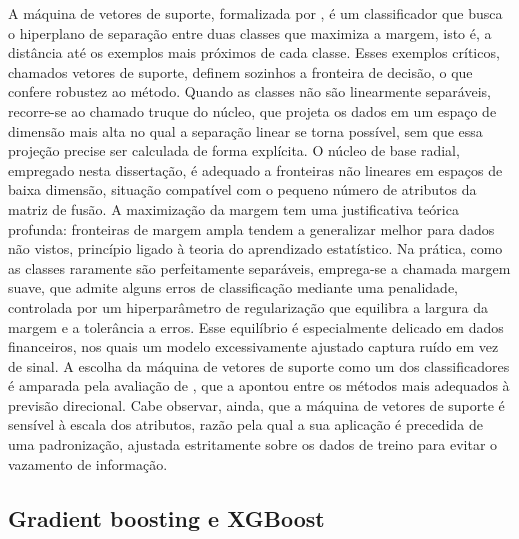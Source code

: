 A máquina de vetores de suporte, formalizada por , é um classificador que busca o hiperplano de separação entre duas classes que maximiza a margem, isto é, a distância até os exemplos mais próximos de cada classe. Esses exemplos críticos, chamados vetores de suporte, definem sozinhos a fronteira de decisão, o que confere robustez ao método. Quando as classes não são linearmente separáveis, recorre-se ao chamado truque do núcleo, que projeta os dados em um espaço de dimensão mais alta no qual a separação linear se torna possível, sem que essa projeção precise ser calculada de forma explícita. O núcleo de base radial, empregado nesta dissertação, é adequado a fronteiras não lineares em espaços de baixa dimensão, situação compatível com o pequeno número de atributos da matriz de fusão. A maximização da margem tem uma justificativa teórica profunda: fronteiras de margem ampla tendem a generalizar melhor para dados não vistos, princípio ligado à teoria do aprendizado estatístico. Na prática, como as classes raramente são perfeitamente separáveis, emprega-se a chamada margem suave, que admite alguns erros de classificação mediante uma penalidade, controlada por um hiperparâmetro de regularização que equilibra a largura da margem e a tolerância a erros. Esse equilíbrio é especialmente delicado em dados financeiros, nos quais um modelo excessivamente ajustado captura ruído em vez de sinal. A escolha da máquina de vetores de suporte como um dos classificadores é amparada pela avaliação de , que a apontou entre os métodos mais adequados à previsão direcional. Cabe observar, ainda, que a máquina de vetores de suporte é sensível à escala dos atributos, razão pela qual a sua aplicação é precedida de uma padronização, ajustada estritamente sobre os dados de treino para evitar o vazamento de informação.

\subsection{Gradient boosting e XGBoost}

